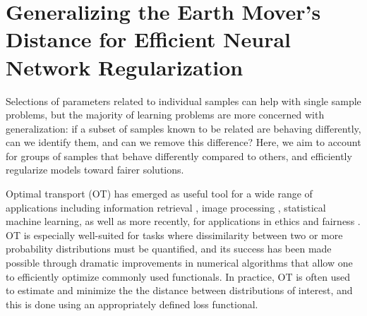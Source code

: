 \chapter{Generalizing the Earth Mover's Distance for Efficient Neural Network Regularization} \label{chap:demd}
Selections of parameters related to individual samples can help with single sample problems,
but the majority of learning problems are more concerned with generalization: if a subset of samples known to be related are behaving differently, can we identify them, and can we remove this difference?
Here, we aim to account for groups of samples that behave differently compared to others, and efficiently regularize models toward fairer solutions.


Optimal transport (OT) has emerged as useful tool for a wide range of applications including information retrieval \citep{balikas2018cross,yurochkin2019hierarchical}, image processing \citep{otip}, statistical machine learning, as well as more recently, for applications in ethics and fairness \citep{kwegyiraggrey2021relative}. 
OT is especially well-suited for tasks where dissimilarity between two or more probability distributions must be quantified,
and its success has been made possible through dramatic improvements in numerical algorithms \citep{cuturi2013sinkhorn,solomon2015convolutional} that allow one to efficiently optimize commonly used functionals.
In practice, OT is often used to estimate and minimize the 
the distance between distributions of interest, 
and this is done using an appropriately defined loss functional. %


